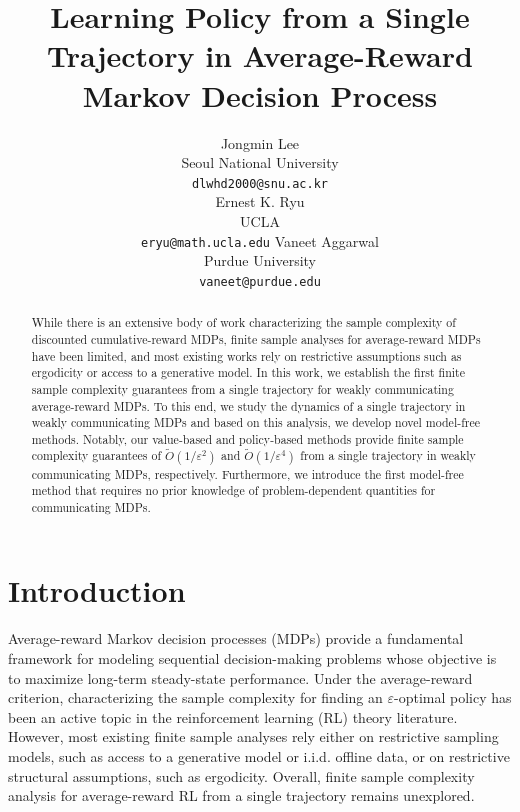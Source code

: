 \documentclass{article}
\title{Learning Policy from a Single Trajectory in Average-Reward Markov Decision Process}
\author{Jongmin Lee\\
Seoul National University\\
\texttt{dlwhd2000@snu.ac.kr} \\
\And
Ernest K. Ryu \\
UCLA \\
\texttt{eryu@math.ucla.edu} 
\And
Vaneet Aggarwal \\
Purdue University \\
\texttt{vaneet@purdue.edu} 
}
\theoremstyle{definition}
\theoremstyle{remark}
\begin{document}
\maketitle


\begin{abstract}
While there is an extensive body of work characterizing the sample complexity of discounted cumulative-reward MDPs, finite sample analyses for average-reward MDPs have been limited, and most existing works rely on restrictive assumptions such as ergodicity or access to a generative model. In this work, we establish the first finite sample complexity guarantees from a single trajectory for weakly communicating average-reward MDPs. To this end, we study the dynamics of a single trajectory in weakly communicating MDPs  and based on this analysis, we develop novel model-free methods. Notably, our value-based and policy-based methods provide finite sample complexity guarantees of $\widetilde{O}(1/\varepsilon^2)$ and $\widetilde{O}(1/\varepsilon^4)$ from a single trajectory in weakly communicating MDPs, respectively. Furthermore, we introduce the first model-free method that requires no prior knowledge of problem-dependent quantities for communicating MDPs.
\end{abstract}



\section{Introduction}

Average-reward Markov decision processes (MDPs) provide a fundamental framework for modeling sequential decision-making problems whose objective is to maximize long-term steady-state performance. Under the average-reward criterion, characterizing the sample complexity for finding an $\varepsilon$-optimal policy has been an active topic in the reinforcement learning (RL) theory literature. However, most existing finite sample analyses rely either on restrictive sampling models, such as access to a generative model or i.i.d. offline data, or on restrictive structural assumptions, such as ergodicity. Overall, finite sample complexity analysis for average-reward RL from a single trajectory remains   unexplored.
\end{document}

